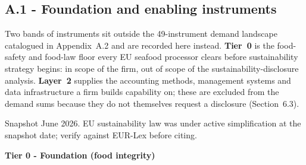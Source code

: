 \subsection*{A.1 - Foundation and enabling instruments}

Two bands of instruments sit outside the 49-instrument demand landscape catalogued
in Appendix~A.2 and are recorded here instead. \textbf{Tier~0} is the food-safety
and food-law floor every EU seafood processor clears before sustainability strategy
begins: in scope of the firm, out of scope of the sustainability-disclosure
analysis. \textbf{Layer~2} supplies the accounting methods, management systems and
data infrastructure a firm builds capability on; these are excluded from the demand
sums because they do not themselves request a disclosure (Section~6.3).

Snapshot June 2026. EU sustainability law was under active simplification at the
snapshot date; verify against EUR-Lex before citing.

\vspace{6pt}
\noindent\textbf{Tier 0 - Foundation (food integrity)}
\vspace{2pt}

